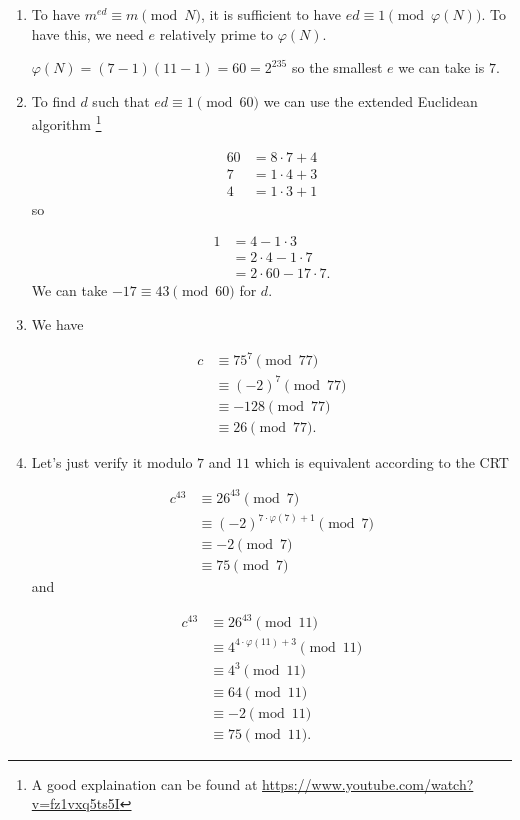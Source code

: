 \newape

\begin{solution}
  \begin{enumerate}
    \item
      To have $m^{ed} \equiv m \pmod{N}$,
      it is sufficient to have $ed \equiv 1 \pmod{\varphi(N)}$.
      To have this, we need $e$ relatively prime to $\varphi(N)$.

      $\varphi(N) = (7-1)(11-1) = 60 = 2^235$
      so the smallest $e$ we can take is $7$.
    \item
      To find $d$ such that $ed \equiv 1 \pmod{60}$ we
      can use the extended Euclidean algorithm \footnote{A good explaination can be found at \url{https://www.youtube.com/watch?v=fz1vxq5ts5I}}

      \begin{align*}
        60 & = 8 \cdot 7 + 4\\
        7 & = 1 \cdot 4 + 3\\
        4 & = 1 \cdot 3 + 1
      \end{align*}
      so

      \begin{align*}
        1 & = 4 - 1 \cdot 3\\
          & = 2 \cdot 4 - 1 \cdot 7\\
          & = 2 \cdot 60 - 17 \cdot 7.
      \end{align*}
      We can take $-17 \equiv 43 \pmod{60}$ for $d$.
    \item
      We have

      \begin{align*}
        c & \equiv 75^7 \pmod{77}\\
          & \equiv (-2)^7 \pmod{77}\\
          & \equiv -128 \pmod{77}\\
          & \equiv 26 \pmod{77}.
      \end{align*}
    \item
      Let's just verify it modulo $7$ and $11$ which is equivalent
      according to the CRT

      \begin{align*}
        c^{43} & \equiv 26^{43} \pmod{7}\\
               & \equiv (-2)^{7 \cdot \varphi(7) + 1} \pmod{7}\\
               & \equiv -2 \pmod{7}\\
               & \equiv 75 \pmod{7}
      \end{align*}
      and

      \begin{align*}
        c^{43} & \equiv 26^{43} \pmod{11}\\
               & \equiv 4^{4 \cdot \varphi(11) + 3} \pmod{11}\\
               & \equiv 4^{3} \pmod{11}\\
               & \equiv 64 \pmod{11}\\
               & \equiv -2 \pmod{11}\\
               & \equiv 75 \pmod{11}.
      \end{align*}
  \end{enumerate}
\end{solution}

